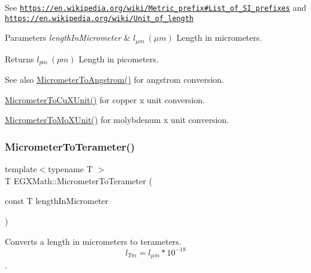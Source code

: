 See \href{https://en.wikipedia.org/wiki/Metric_prefix#List_of_SI_prefixes}{\tt https\+://en.\+wikipedia.\+org/wiki/\+Metric\+\_\+prefix\#\+List\+\_\+of\+\_\+\+S\+I\+\_\+prefixes} and \href{https://en.wikipedia.org/wiki/Unit_of_length}{\tt https\+://en.\+wikipedia.\+org/wiki/\+Unit\+\_\+of\+\_\+length} 
\begin{DoxyParams}{Parameters}
{\em length\+In\+Micrometer} & $ l_{\mu m}\ (\mu m)$ Length in micrometers. \\
\hline
\end{DoxyParams}
\begin{DoxyReturn}{Returns}
$ l_{pm}\ (pm)$ Length in picometers. 
\end{DoxyReturn}
\begin{DoxySeeAlso}{See also}
\mbox{\hyperlink{group___e_g_x_math-_conversions-_length_conversions-_micrometer-_non-_s_i_ga4b7df35169682046455e9a6f99447777}{Micrometer\+To\+Angstrom()}} for angstrom conversion. 

\mbox{\hyperlink{group___e_g_x_math-_conversions-_length_conversions-_micrometer-_non-_s_i_ga9ec609bbfdde5144c9f40d9093a5b8a7}{Micrometer\+To\+Cu\+X\+Unit()}} for copper x unit conversion. 

\mbox{\hyperlink{group___e_g_x_math-_conversions-_length_conversions-_micrometer-_non-_s_i_ga2ed475ce56e23d7783d6925f5b409f44}{Micrometer\+To\+Mo\+X\+Unit()}} for molybdenum x unit conversion. 
\end{DoxySeeAlso}
\mbox{\label{group___e_g_x_math-_conversions-_length_conversions-_micrometer-_s_i_ga1f22962ca08a1b8970abc277530d07a3}} 
\subsubsection{\texorpdfstring{Micrometer\+To\+Terameter()}{MicrometerToTerameter()}}
{\footnotesize\ttfamily template$<$typename T $>$ \\
T E\+G\+X\+Math\+::\+Micrometer\+To\+Terameter (\begin{DoxyParamCaption}\item[{const T}]{length\+In\+Micrometer }\end{DoxyParamCaption})}



Converts a length in micrometers to terameters. \[ l_{Tm}=l_{\mu m} * 10^{-18} \]. 

